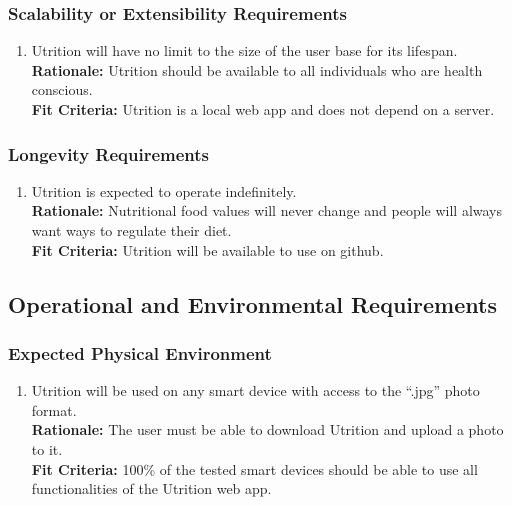 \documentclass[12pt]{article}
\begin{document}
\subsubsection{Scalability or Extensibility Requirements}

\begin{enumerate}[{PR}8. ] 
	\item Utrition will have no limit to the size of the user base for its lifespan. \\
	\textbf{Rationale:} Utrition should be available to all individuals who are health conscious.\\
	\textbf{Fit Criteria:} Utrition is a local web app and does not depend on a server.
\end{enumerate}

\subsubsection{Longevity Requirements}

\begin{enumerate}[{PR}9. ] 
	\item Utrition is expected to operate indefinitely.\\
	\textbf{Rationale:} Nutritional food values will never change and people will always want ways to regulate their diet. \\
	\textbf{Fit Criteria:} Utrition will be available to use on github.
\end{enumerate}

\subsection{Operational and Environmental Requirements}

\subsubsection{Expected Physical Environment}
\begin{enumerate}[{OE}1. ] 
	\item Utrition will be used on any smart device with access to the “.jpg” photo format.\\
	\textbf{Rationale:} The user must be able to download Utrition and upload a photo to it. \\
	\textbf{Fit Criteria:} 100\% of the tested smart devices should be able to use all functionalities of the Utrition web app.
\end{enumerate}
\end{document}
